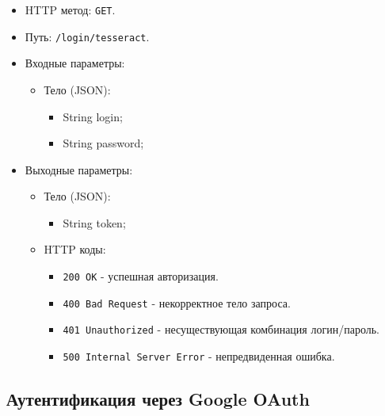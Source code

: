 \documentclass[a4paper, 14pt]{article}
\begin{document}
\begin{itemize}
    \item HTTP метод: \texttt{GET}.
    \item Путь: \texttt{/login/tesseract}.
    \item Входные параметры:
    \begin{itemize}
        \item Тело (JSON):
        \begin{itemize}
            \item String login;
            \item String password;
        \end{itemize}
    \end{itemize}
    \item Выходные параметры:
    \begin{itemize}
        \item Тело (JSON):
        \begin{itemize}
            \item String token;
        \end{itemize}
        \item HTTP коды:
        \begin{itemize}
            \item \texttt{200 OK} - успешная авторизация.
            \item \texttt{400 Bad Request} - некорректное тело запроса.
            \item \texttt{401 Unauthorized} - несуществующая комбинация логин/пароль.
            \item \texttt{500 Internal Server Error} - непредвиденная ошибка.
        \end{itemize}
    \end{itemize}
\end{itemize}

\subsection{Аутентификация через Google OAuth}
\end{document}
